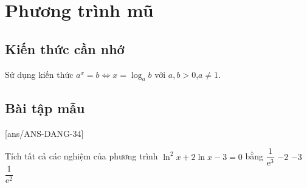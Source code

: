 \setcounter{section}{33}
\setcounter{ex}{0}
\section{Phương trình mũ}
\subsection{Kiến thức cần nhớ}
\begin{khung}
	Sử dụng kiến thức $a^x=b\Leftrightarrow x=\log_{a}b$ với $a,b>0$,$a\ne 1$.
\end{khung}
\subsection{Bài tập mẫu}
[ans/ANS-DANG-34]
\begin{khung}
	\begin{vd}%
		Tích tất cả các nghiệm của phương trình $\ln^2{x}+2\ln x-3=0$ bằng
		\choice
		{\True $\dfrac{1}{\mathrm{e^3}}$}
		{$-2$}
		{$-3$}
		{$\dfrac{1}{\mathrm{e^2}}$}
	\end{vd}
\end{khung}
